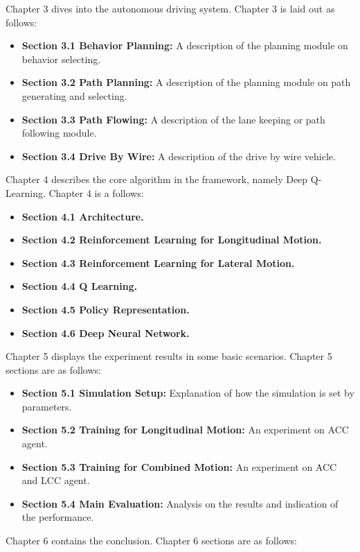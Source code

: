 Chapter 3 dives into the autonomous driving system. Chapter 3 is laid out as follows:

\begin{itemize}
\item \textbf {Section 3.1 Behavior Planning:} A description of the planning module on behavior selecting.
\item \textbf {Section 3.2 Path Planning:} A description of the planning module on path generating and selecting.
\item \textbf {Section 3.3 Path Flowing:} A description of the lane keeping or path following module.
\item \textbf {Section 3.4 Drive By Wire:} A description of the drive by wire vehicle.
\end{itemize}

Chapter 4 describes the core algorithm in the framework, namely Deep Q-Learning. Chapter 4 is a follows:

\begin{itemize}
\item \textbf {Section 4.1 Architecture.} 
\item \textbf {Section 4.2 Reinforcement Learning for Longitudinal Motion.}
\item \textbf {Section 4.3 Reinforcement Learning for Lateral Motion.}
\item \textbf {Section 4.4 Q Learning.} 
\item \textbf {Section 4.5 Policy Representation.}
\item \textbf {Section 4.6 Deep Neural Network.}
\end{itemize}

Chapter 5 displays the experiment results in some basic scenarios. Chapter 5 sections are as follows:

\begin{itemize}
\item \textbf {Section 5.1 Simulation Setup:} Explanation of how the simulation is set by parameters.
\item \textbf {Section 5.2 Training for Longitudinal Motion:} An experiment on ACC agent.
\item \textbf {Section 5.3 Training for Combined Motion:} An experiment on ACC and LCC agent.
\item \textbf {Section 5.4 Main Evaluation:} Analysis on the results and indication of the performance.
\end{itemize}

Chapter 6 contains the conclusion. Chapter 6 sections are as follows:

